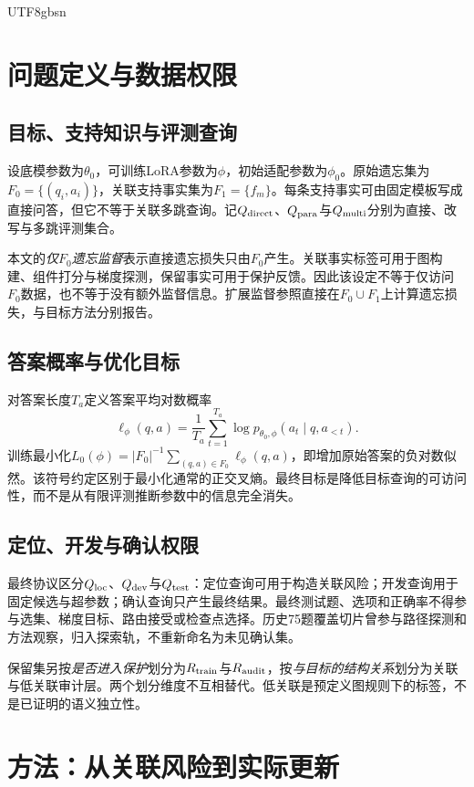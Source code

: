 \documentclass[sigconf,anonymous,review]{acmart}
\begin{document}
\begin{CJK*}{UTF8}{gbsn}
\section{问题定义与数据权限}
\subsection{目标、支持知识与评测查询}
设底模参数为$\theta_0$，可训练LoRA参数为$\phi$，初始适配参数为$\phi_0$。原始遗忘集为$F_0=\{(q_i,a_i)\}$，关联支持事实集为$F_1=\{f_m\}$。每条支持事实可由固定模板写成直接问答，但它不等于关联多跳查询。记$Q_{\rm direct}$、$Q_{\rm para}$与$Q_{\rm multi}$分别为直接、改写与多跳评测集合。

本文的\emph{仅$F_0$遗忘监督}表示直接遗忘损失只由$F_0$产生。关联事实标签可用于图构建、组件打分与梯度探测，保留事实可用于保护反馈。因此该设定不等于仅访问$F_0$数据，也不等于没有额外监督信息。扩展监督参照直接在$F_0\cup F_1$上计算遗忘损失，与目标方法分别报告。

\subsection{答案概率与优化目标}
对答案长度$T_a$定义答案平均对数概率
\begin{equation}
 \ell_\phi(q,a)=\frac{1}{T_a}\sum_{t=1}^{T_a}
 \log p_{\theta_0,\phi}(a_t\mid q,a_{<t}).
 \label{eq:lp}
\end{equation}
训练最小化$L_0(\phi)=|F_0|^{-1}\sum_{(q,a)\in F_0}\ell_\phi(q,a)$，即增加原始答案的负对数似然。该符号约定区别于最小化通常的正交叉熵。最终目标是降低目标查询的可访问性，而不是从有限评测推断参数中的信息完全消失。

\subsection{定位、开发与确认权限}
最终协议区分$Q_{\rm loc}$、$Q_{\rm dev}$与$Q_{\rm test}$：定位查询可用于构造关联风险；开发查询用于固定候选与超参数；确认查询只产生最终结果。最终测试题、选项和正确率不得参与选集、梯度目标、路由接受或检查点选择。历史75题覆盖切片曾参与路径探测和方法观察，归入探索轨，不重新命名为未见确认集。

保留集另按\emph{是否进入保护}划分为$R_{\rm train}$与$R_{\rm audit}$，按\emph{与目标的结构关系}划分为关联与低关联审计层。两个划分维度不互相替代。低关联是预定义图规则下的标签，不是已证明的语义独立性。

\section{方法：从关联风险到实际更新}
\label{sec:method}

\end{CJK*}
\end{document}

